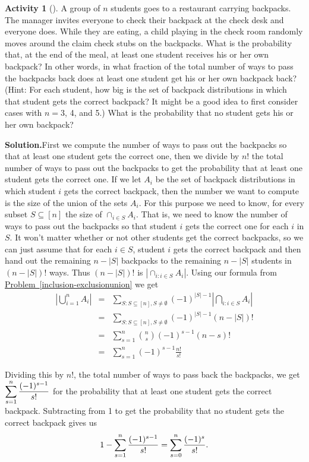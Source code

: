 \documentclass[10pt,]{book}
\theoremstyle{plain}
\theoremstyle{definition}
\newtheorem{activity}[project]{Activity}
\numberwithin{equation}{chapter}
\newcommand{\amp}{&}
\begin{document}
\begin{activity}[]\label{hatcheck}
A group of \(n\) students goes to a restaurant carrying backpacks. The manager invites everyone to check their backpack at the check desk and everyone does. While they are eating, a child playing in the check room randomly moves around the claim check stubs on the backpacks. What is the probability that, at the end of the meal, at least one student receives his or her own backpack? In other words, in what fraction of the total number of ways to pass the backpacks back does at least one student get his or her own backpack back? (Hint: For each student, how big is the set of backpack distributions in which that student gets the correct backpack? It might be a good idea to first consider cases with \(n=3\), 4, and 5.) What is the probability that no student gets his or her own backpack?%
\par\medskip\noindent%
\textbf{Solution.}\quad First we compute the number of ways to pass out the backpacks so that at least one student gets the correct one, then we divide by \(n!\) the total number of ways to pass out the backpacks to get the probability that at least one student gets the correct one. If we let \(A_i\) be the set of backpack distributions in which student \(i\) gets the correct backpack, then the number we want to compute is the size of the union of the sets \(A_i\). For this purpose we need to know, for every subset \(S\subseteq [n]\) the size of \(\cap_{i\in S}A_i\). That is, we need to know the number of ways to pass out the backpacks so that student \(i\) gets the correct one for each \(i\) in \(S\). It won't matter whether or not other students get the correct backpacks, so we can just assume that for each \(i\in S\), student \(i\) gets the correct backpack and then hand out the remaining \(n-|S|\) backpacks to the remaining \(n-|S|\) students in \((n-|S|)!\) ways. Thus \((n-|S|)!\) is \(|\cap_{i:i\in S}A_i|\). Using our formula from \hyperref[inclusion-exclusionunion]{Problem~\ref{inclusion-exclusionunion}} we get%
\begin{align*}
\left|\bigcup_{i=1}^n A_i \right| \amp =\amp  \sum_{S:
S\subseteq [n], S\not=\emptyset}
(-1)^{|S|-1}\left|\bigcap_{i:i\in S} A_i \right|\\
\amp =\amp \sum_{S:
S\subseteq [n], S\not=\emptyset}(-1)^{|S|-1} (n-|S|)!\\
\amp =\amp
\sum_{s=1}^n \binom{n}{s}(-1)^{s-1}(n-s)!\\
\amp =\amp \sum_{s=1}^n
(-1)^{s-1}\frac{n!}{s!}
\end{align*}
%
\par
Dividing this by \(n!\), the total number of ways to pass back the backpacks, we get \(\displaystyle \sum_{s=1}^n {(-1)^{s-1}\over s!}\) for the probability that at least one student gets the correct backpack. Subtracting from 1 to get the probability that no student gets the correct backpack gives us%
\begin{equation*}
1- \sum_{s=1}^n {(-1)^{s-1}\over
s!}=\sum_{s=0}^n\frac{(-1)^s}{s!}.
\end{equation*}
%
\end{activity}
\end{document}
